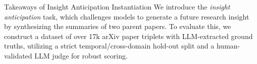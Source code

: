 \begin{AIbox}{Takeaways of Insight Anticipation Instantiation}
We introduce the \emph{insight anticipation} task, which challenges models to generate a future research insight by synthesizing the summaries of two parent papers. To evaluate this, we construct a dataset of over 17k arXiv paper triplets with LLM-extracted ground truths, utilizing a strict temporal/cross-domain hold-out split and a human-validated LLM judge for robust scoring.
\end{AIbox}






